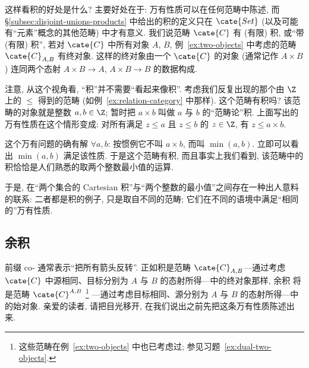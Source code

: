 这样看积的好处是什么? 主要好处在于: 万有性质可以在任何范畴中陈述, 而 \S\ref{subsec:disjoint-unions-products} 中给出的积的定义只在 $\cate{Set}$ (以及可能有``元素''概念的其他范畴) 中才有意义. 我们说范畴 $\cate{C}$ 有 (有限) 积, 或``带 (有限) 积'', 若对 $\cate{C}$ 中所有对象 $A$, $B$, 例~\ref{ex:two-objects} 中考虑的范畴 $\cate{C}_{A,B}$ 有终对象. 这样的终对象由一个 $\cate{C}$ 的对象 (通常记作 $A \times B$) 连同两个态射 $A \times B \to A$, $A \times B \to B$ 的数据构成.

注意, 从这个视角看, ``积''并不需要``看起来像积''. 考虑我们反复出现的那个由 $\Z$ 上的 $\leq$ 得到的范畴 (如例~\ref{ex:relation-category} 中那样). 这个范畴有积吗? 该范畴的对象就是整数 $a, b \in \Z$; 暂时把 $a \times b$ 叫做 $a$ 与 $b$ 的``范畴论''积. 上面写出的万有性质在这个情形变成: 对所有满足 $z \leq a$ 且 $z \leq b$ 的 $z \in \Z$, 有 $z \leq a \times b$.

这个万有问题的确有解 $\forall a, b$: 按惯例它不叫 $a \times b$, 而叫 $\min(a,b)$. 立即可以看出 $\min(a,b)$ 满足该性质. 于是这个范畴有积, 而且事实上我们看到, 该范畴中的积恰恰是人们熟悉的取两个整数最小值的运算.

于是, 在``两个集合的 Cartesian 积''与``两个整数的最小值''之间存在一种出人意料的联系: 二者都是积的例子, 只是取自不同的范畴; 它们在不同的语境中满足``相同的''万有性质.

\subsection{余积}
\label{subsec:coproducts-up}

前缀 co- 通常表示``把所有箭头反转''. 正如积是范畴 $\cate{C}_{A,B}$---通过考虑 $\cate{C}$ 中源相同、目标分别为 $A$ 与 $B$ 的态射所得---中的终对象那样, 余积%
将是范畴 $\cate{C}^{A,B}$%
\footnote{这些范畴在例~\ref{ex:two-objects} 中也已考虑过; 参见习题~\ref{ex:dual-two-objects}.}%
---通过考虑目标相同、源分别为 $A$ 与 $B$ 的态射所得---中的始对象. 亲爱的读者, 请把目光移开, 在我们说出之前先把这条万有性质陈述出来.

